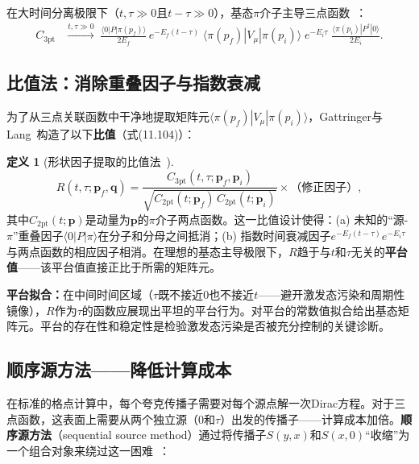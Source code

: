 \documentclass[12pt,a4paper]{ctexart}
\theoremstyle{definition}
\newtheorem{definition}{定义}[section]
\begin{document}
在大时间分离极限下（$t, \tau \gg 0$且$t-\tau \gg 0$），基态$\pi$介子主导三点函数~\cite{GattringerLang2010}：
\begin{equation}
\begin{aligned}
C_{3\text{pt}} &\xrightarrow{t,\tau \gg 0} \;
\frac{\langle 0|P|\pi(p_f)\rangle}{2E_f} \,
e^{-E_f(t-\tau)} \;
\langle \pi(p_f) | V_\mu | \pi(p_i) \rangle \;
e^{-E_i \tau} \;
\frac{\langle \pi(p_i)|P^\dagger|0\rangle}{2E_i}.
\end{aligned}
\label{eq:ground_state_3pt}
\end{equation}

\subsection{比值法：消除重叠因子与指数衰减}

为了从三点关联函数中干净地提取矩阵元$\langle \pi(p_f)|V_\mu|\pi(p_i)\rangle$，Gattringer与Lang~\cite{GattringerLang2010}构造了以下\textbf{比值}（式(11.104)）：

\begin{definition}[形状因子提取的比值法~\cite{GattringerLang2010}]
\begin{equation}
\boxed{
R(t, \tau; \mathbf{p}_f, \mathbf{q}) =
\frac{C_{3\text{pt}}(t,\tau; \mathbf{p}_f, \mathbf{p}_i)}
{\sqrt{C_{2\text{pt}}(t; \mathbf{p}_f) \, C_{2\text{pt}}(t; \mathbf{p}_i)}}
\times \text{（修正因子）},
}
\label{eq:ratio_method}
\end{equation}
其中$C_{2\text{pt}}(t; \mathbf{p})$是动量为$\mathbf{p}$的$\pi$介子两点函数。这一比值设计使得：(a) 未知的``源-$\pi$''重叠因子$\langle 0|P|\pi\rangle$在分子和分母之间抵消；(b) 指数时间衰减因子$e^{-E_f(t-\tau)}e^{-E_i\tau}$与两点函数的相应因子相消。在理想的基态主导极限下，$R$趋于与$t$和$\tau$无关的\textbf{平台值}——该平台值直接正比于所需的矩阵元。
\end{definition}

\textbf{平台拟合：}在中间时间区域（$\tau$既不接近$0$也不接近$t$——避开激发态污染和周期性镜像），$R$作为$\tau$的函数应展现出平坦的平台行为。对平台的常数值拟合给出基态矩阵元。平台的存在性和稳定性是检验激发态污染是否被充分控制的关键诊断。

\subsection{顺序源方法——降低计算成本}

在标准的格点计算中，每个夸克传播子需要对每个源点解一次Dirac方程。对于三点函数，这表面上需要从两个独立源（$0$和$\tau$）出发的传播子——计算成本加倍。\textbf{顺序源方法}（sequential source method）通过将传播子$S(y,x)$和$S(x,0)$``收缩''为一个组合对象来绕过这一困难~\cite{GattringerLang2010}：
\end{document}
